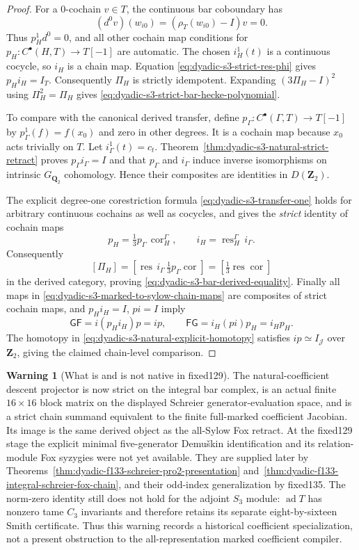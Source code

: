 \documentclass[11pt]{article}
\theoremstyle{definition}
\newtheorem{warning}[theorem]{Warning}
\begin{document}
\begin{proof}
For a $0$-cochain $v\in T$,
the continuous bar coboundary
has
\[
(d^0v)(w_{i0})
=(\rho_T(w_{i0})-I)v=0.
\]
Thus $p_H^1d^0=0$,
and all other cochain
map conditions for
$p_H:C^\bullet(H,T)\to T[-1]$
are automatic.
The chosen $i_H^1(t)$
is a continuous cocycle,
so $i_H$ is a chain map.
Equation
\eqref{eq:dyadic-s3-strict-res-phi}
gives $p_Hi_H=I_T$.
Consequently $\Pi_H$
is strictly idempotent.
Expanding
$(3\Pi_H-I)^2$
using $\Pi_H^2=\Pi_H$
gives
\eqref{eq:dyadic-s3-strict-bar-hecke-polynomial}.

To compare with the canonical
derived transfer, define
$p_\Gamma:C^\bullet(\Gamma,T)\to T[-1]$
by $p_\Gamma^1(f)=f(x_0)$
and zero in other degrees.
It is a cochain map because
$x_0$ acts trivially on $T$.
Let $i_\Gamma^1(t)=c_t$.
Theorem~\ref{thm:dyadic-s3-natural-strict-retract}
proves $p_\Gamma i_\Gamma=I$
and that $p_\Gamma$ and
$i_\Gamma$ induce inverse
isomorphisms on intrinsic
$G_{\mathbf Q_2}$ cohomology.
Hence their composites are
identities in $D(\mathbf Z_2)$.

The explicit degree-one
corestriction formula
\eqref{eq:dyadic-s3-transfer-one}
holds for arbitrary
continuous cochains as
well as cocycles, and
gives the \emph{strict}
identity of cochain maps
\[
p_H=\tfrac13 p_\Gamma
\,\operatorname{cor}_H^\Gamma,
\qquad
i_H=\operatorname{res}_H^\Gamma
\,i_\Gamma.
\]
Consequently
\[
[\Pi_H]=
\left[\operatorname{res}\,
i_\Gamma\,\tfrac13p_\Gamma
\operatorname{cor}\right]
=\left[\tfrac13\operatorname{res}
\operatorname{cor}\right]
\]
in the derived category,
proving
\eqref{eq:dyadic-s3-bar-derived-equality}.
Finally all maps in
\eqref{eq:dyadic-s3-marked-to-sylow-chain-maps}
are composites of strict
cochain maps, and
$p_Hi_H=I$, $pi=I$
imply
\[
\mathsf G\mathsf F
=i(p_Hi_H)p=ip,\qquad
\mathsf F\mathsf G
=i_H(pi)p_H=i_Hp_H.
\]
The homotopy in
\eqref{eq:dyadic-s3-natural-explicit-homotopy}
satisfies $ip\simeq I_{\mathcal J}$
over $\mathbf Z_2$,
giving the claimed chain-level
comparison.
\end{proof}

\begin{warning}[What is and is not native in fixed129]
\label{warn:dyadic-s3-natural-minimal-fox-boundary}
The natural-coefficient descent
projector is now strict on
the integral bar complex,
is an actual finite
$16\times16$ block matrix
on the displayed Schreier
generator-evaluation space,
and is a strict chain
summand equivalent to the
finite full-marked
coefficient Jacobian.
Its image is the same
derived object as the
all-Sylow Fox retract.
At the fixed129 stage the
explicit minimal five-generator
Demu\v{s}kin identification and
its relation-module Fox syzygies
were not yet available.
They are supplied later by
Theorems~\ref{thm:dyadic-f133-schreier-pro2-presentation}
and~\ref{thm:dyadic-f133-integral-schreier-fox-chain},
and their odd-index generalization by fixed135.
The norm-zero identity still does
not hold for the adjoint $S_3$ module:
$\operatorname{ad}T$ has nonzero tame
$C_3$ invariants and therefore retains
its separate eight-by-sixteen Smith certificate.
Thus this warning records a historical coefficient
specialization, not a present obstruction to the
all-representation marked coefficient compiler.
\end{warning}
\end{document}
